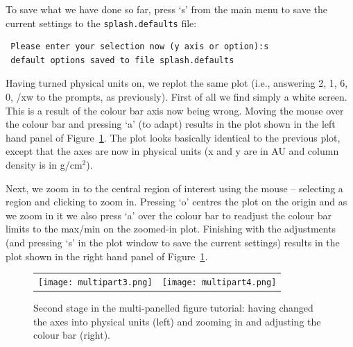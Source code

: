 \documentclass[a4paper,10pt]{article}
\begin{document}
 To save what we have done so far, press `s' from the main menu to save the current settings to the \verb+splash.defaults+ file:
\begin{verbatim}
 Please enter your selection now (y axis or option):s
 default options saved to file splash.defaults
\end{verbatim}

 Having turned physical units on, we replot the same plot (i.e., answering 2, 1, 6, 0, /xw to the prompts, as previously). First of all we find simply a white screen. This is a result of the colour bar axis now being wrong. Moving the mouse over the colour bar and pressing `a' (to adapt) results in the plot shown in the left hand panel of Figure~\ref{fig:multipart3}. The plot looks basically identical to the previous plot, except that the axes are now in physical units (x and y are in AU and column density is in g/cm$^{2}$). 

Next, we zoom in to the central region of interest using the mouse -- selecting a region and clicking to zoom in. Pressing `o' centres the plot on the origin and as we zoom in it we also press `a' over the colour bar to readjust the colour bar limits to the max/min on the zoomed-in plot. Finishing with the adjustments (and pressing `s' in the plot window to save the current settings) results in the plot shown in the right hand panel of Figure~\ref{fig:multipart3}.
\begin{figure}[h]
\begin{center}
\begin{tabular}{cc}
\texttt{[image: multipart3.png]} &
\texttt{[image: multipart4.png]}
\end{tabular}
\caption{Second stage in the multi-panelled figure tutorial: having changed the axes into physical units (left) and zooming in and adjusting the colour bar (right).}
\label{fig:multipart3}
\end{center}
\end{figure}
\end{document}
